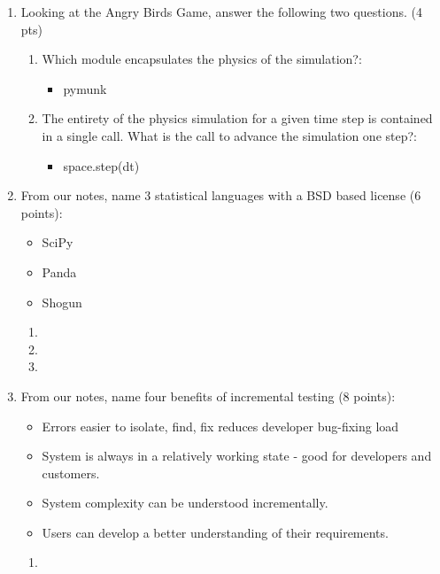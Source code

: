 \documentclass[10pt]{article}
\begin{document}
\begin{enumerate}
\begin{enumerate}
	\item Looking at the Angry Birds Game, answer the following two questions. (4 pts)
	\begin{enumerate}
		\item Which module encapsulates the physics of the simulation?:
		\beginanswers
		\begin{itemize}
			\item pymunk
		\end{itemize}
		\else
		\bigskip
		\bigskip
		\bigskip
		\bigskip
		\item The entirety of the physics simulation for a given time step is contained in a single call. What is the call to advance the simulation one step?:
		\beginanswers
		\begin{itemize}
			\item space.step(dt) 
		\end{itemize}
		\else
		\bigskip
		\bigskip
		\bigskip
		\bigskip
	\end{enumerate}
\bigskip
\bigskip
\item From our notes, name 3 statistical  languages with a BSD based license (6 points):
\beginanswers
\begin{itemize}
	\item SciPy
	\item Panda
	\item Shogun
\end{itemize}
\else
\begin{enumerate}
	\item 
	\bigskip
	\bigskip
	\item
	\bigskip
	\bigskip
	\item 
	\bigskip
	\bigskip
\end{enumerate}
\fi
\bigskip
\bigskip
\item From our notes, name four benefits of incremental testing (8 points):
\beginanswers
\begin{itemize}
	\item Errors easier to isolate, find, fix reduces developer bug-fixing load
	\item System is always in a relatively working state - good for developers and customers.
	\item System complexity can be understood incrementally.
	\item Users can develop a better understanding of their requirements.
\end{itemize}
\else
\begin{enumerate}
	\item 

\end{enumerate}
\end{enumerate}
\end{enumerate}
\end{document}
